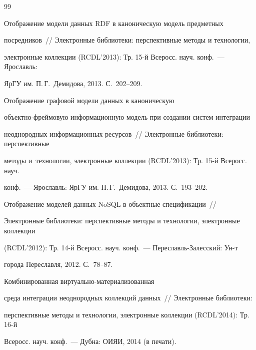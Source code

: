 {\small\frenchspacing

{ %


\begin{thebibliography}{99}



\vspace*{-2pt}




 Отображение модели данных RDF в каноническую модель предметных

посредников~/\!\!/ Электронные библиотеки: перспективные методы и технологии,

электронные коллекции (RCDL'2013): Тр. 15-й Всеросс. науч. конф.~--- Ярославль:

ЯрГУ им. П.\,Г.~Демидова, 2013. С.~202--209.


 Отображение графовой модели данных в каноническую

объект\-но-фрей\-мо\-вую информационную модель при создании систем интеграции

неоднородных информационных ресурсов~/\!\!/ Электронные библиотеки: перспективные

методы и~технологии, электронные коллекции (RCDL'2013): Тр. 15-й Всеросс. науч.

конф.~--- Ярославль: ЯрГУ им. П.\,Г.~Демидова, 2013. С.~193--202.


 Отображение моделей данных NoSQL в объектные спецификации~/\!\!/

Электронные библиотеки: перспективные методы и технологии, электронные коллекции

(RCDL'2012): Тр. 14-й Всеросс. науч. конф.~--- Пе\-ре\-славль-За\-лес\-ский: Ун-т

города Переславля, 2012. С.~78--87.


 Комбинированная виртуально-материализованная

среда интеграции неоднородных коллекций данных~/\!\!/ Электронные библиотеки:

перспективные методы и технологии, электронные коллекции (RCDL'2014): Тр. 16-й

Всеросс. науч. конф.~--- Дубна: ОИЯИ, 2014 (в печати).


\end{thebibliography}}}
